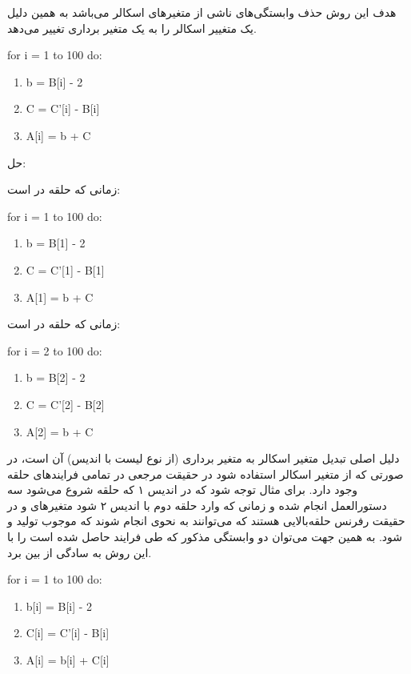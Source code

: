 \documentclass[20pt, a4paper]{article}
\begin{document}
هدف این روش حذف وابستگی‌های ناشی از متغیر‌های اسکالر می‌باشد به همین دلیل یک
متغییر اسکالر را به یک متغیر برداری تغییر می‌دهد.

\begin{LTR}
    for i = 1 to 100 do:
    \begin{enumerate}
        \item b = B[i] - 2
        \item C = C'[i] - B[i]
        \item A[i] = b + C
    \end{enumerate}
\end{LTR}


حل:

زمانی که حلقه در  است:

\begin{LTR}
    for i = 1 to 100 do:
    \begin{enumerate}
        \item b = B[1] - 2
        \item C = C'[1] - B[1]
        \item A[1] = b + C
    \end{enumerate}
\end{LTR}

زمانی که حلقه در  است:

\begin{LTR}
    for i = 2 to 100 do:
    \begin{enumerate}
        \item b = B[2] - 2
        \item C = C'[2] - B[2]
        \item A[2] = b + C
    \end{enumerate}
\end{LTR}

دلیل اصلی تبدیل متغیر اسکالر به متغیر برداری (از نوع لیست با اندیس) آن است، در
صورتی که از متغیر اسکالر استفاده شود در حقیقت مرجعی در تمامی فرایند‌های حلقه
وجود دارد. برای مثال توجه شود که در اندیس ۱ که حلقه شروع می‌شود سه دستورالعمل
انجام شده و زمانی که وارد حلقه دوم با اندیس ۲ شود متغیر‌های  و  در
حقیقت رفرنس حلقه‌بالایی هستند که می‌توانند به نحوی انجام شوند که موجوب تولید
 و  شود. به همین جهت می‌توان
دو وابستگی مذکور که طی فرایند حاصل شده است را با این روش به سادگی از بین برد.

\begin{LTR}
    for i = 1 to 100 do:
    \begin{enumerate}
        \item b[i] = B[i] - 2
        \item C[i] = C'[i] - B[i]
        \item A[i] = b[i] + C[i]
    \end{enumerate}
\end{LTR}
\end{document}
